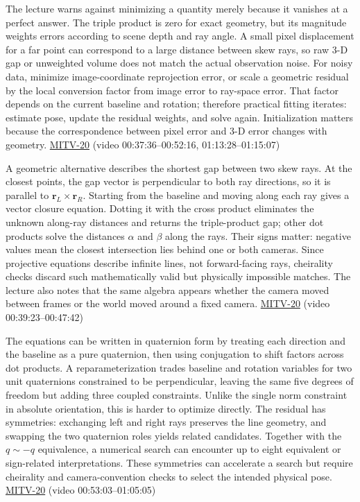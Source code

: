 The lecture warns against minimizing a quantity merely because it vanishes at a perfect answer. The triple product is zero for exact geometry, but its magnitude weights errors according to scene depth and ray angle. A small pixel displacement for a far point can correspond to a large distance between skew rays, so raw 3-D gap or unweighted volume does not match the actual observation noise. For noisy data, minimize image-coordinate reprojection error, or scale a geometric residual by the local conversion factor from image error to ray-space error. That factor depends on the current baseline and rotation; therefore practical fitting iterates: estimate pose, update the residual weights, and solve again. Initialization matters because the correspondence between pixel error and 3-D error changes with geometry. \hyperref[04-visual-computing-ii-ch036-mitv-20---space-of-rotations-regular-tessellations-critical-surfaces-binocular-stereo]{MITV-20} (video 00:37:36--00:52:16, 01:13:28--01:15:07)

A geometric alternative describes the shortest gap between two skew rays. At the closest points, the gap vector is perpendicular to both ray directions, so it is parallel to \(\mathbf{r}_L\times\mathbf{r}_R\). Starting from the baseline and moving along each ray gives a vector closure equation. Dotting it with the cross product eliminates the unknown along-ray distances and returns the triple-product gap; other dot products solve the distances \(\alpha\) and \(\beta\) along the rays. Their signs matter: negative values mean the closest intersection lies behind one or both cameras. Since projective equations describe infinite lines, not forward-facing rays, cheirality checks discard such mathematically valid but physically impossible matches. The lecture also notes that the same algebra appears whether the camera moved between frames or the world moved around a fixed camera. \hyperref[04-visual-computing-ii-ch036-mitv-20---space-of-rotations-regular-tessellations-critical-surfaces-binocular-stereo]{MITV-20} (video 00:39:23--00:47:42)

The equations can be written in quaternion form by treating each direction and the baseline as a pure quaternion, then using conjugation to shift factors across dot products. A reparameterization trades baseline and rotation variables for two unit quaternions constrained to be perpendicular, leaving the same five degrees of freedom but adding three coupled constraints. Unlike the single norm constraint in absolute orientation, this is harder to optimize directly. The residual has symmetries: exchanging left and right rays preserves the line geometry, and swapping the two quaternion roles yields related candidates. Together with the \(q\sim -q\) equivalence, a numerical search can encounter up to eight equivalent or sign-related interpretations. These symmetries can accelerate a search but require cheirality and camera-convention checks to select the intended physical pose. \hyperref[04-visual-computing-ii-ch036-mitv-20---space-of-rotations-regular-tessellations-critical-surfaces-binocular-stereo]{MITV-20} (video 00:53:03--01:05:05)

